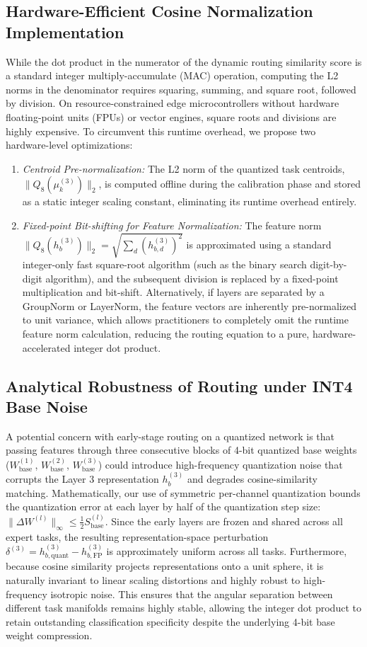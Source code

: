 \documentclass{article}
\theoremstyle{plain}
\theoremstyle{definition}
\theoremstyle{remark}
\begin{document}
\subsection{Hardware-Efficient Cosine Normalization Implementation}
While the dot product in the numerator of the dynamic routing similarity score is a standard integer multiply-accumulate (MAC) operation, computing the L2 norms in the denominator requires squaring, summing, and square root, followed by division. On resource-constrained edge microcontrollers without hardware floating-point units (FPUs) or vector engines, square roots and divisions are highly expensive. To circumvent this runtime overhead, we propose two hardware-level optimizations:
\begin{enumerate}
    \item \emph{Centroid Pre-normalization:} The L2 norm of the quantized task centroids, $\|Q_8(\mu_k^{(3)})\|_2$, is computed offline during the calibration phase and stored as a static integer scaling constant, eliminating its runtime overhead entirely.
    \item \emph{Fixed-point Bit-shifting for Feature Normalization:} The feature norm $\|Q_8(h_b^{(3)})\|_2 = \sqrt{\sum_d (h_{b, d}^{(3)})^2}$ is approximated using a standard integer-only fast square-root algorithm (such as the binary search digit-by-digit algorithm), and the subsequent division is replaced by a fixed-point multiplication and bit-shift. Alternatively, if layers are separated by a GroupNorm or LayerNorm, the feature vectors are inherently pre-normalized to unit variance, which allows practitioners to completely omit the runtime feature norm calculation, reducing the routing equation to a pure, hardware-accelerated integer dot product.
\end{enumerate}

\subsection{Analytical Robustness of Routing under INT4 Base Noise}
A potential concern with early-stage routing on a quantized network is that passing features through three consecutive blocks of 4-bit quantized base weights ($W_{\text{base}}^{(1)}$, $W_{\text{base}}^{(2)}$, $W_{\text{base}}^{(3)}$) could introduce high-frequency quantization noise that corrupts the Layer 3 representation $h_b^{(3)}$ and degrades cosine-similarity matching. Mathematically, our use of symmetric per-channel quantization bounds the quantization error at each layer by half of the quantization step size: $\| \Delta W^{(l)} \|_{\infty} \le \frac{1}{2} S_{\text{base}}^{(l)}$. Since the early layers are frozen and shared across all expert tasks, the resulting representation-space perturbation $\delta^{(3)} = h_{b, \text{quant}}^{(3)} - h_{b, \text{FP}}^{(3)}$ is approximately uniform across all tasks. Furthermore, because cosine similarity projects representations onto a unit sphere, it is naturally invariant to linear scaling distortions and highly robust to high-frequency isotropic noise. This ensures that the angular separation between different task manifolds remains highly stable, allowing the integer dot product to retain outstanding classification specificity despite the underlying 4-bit base weight compression.
\end{document}
